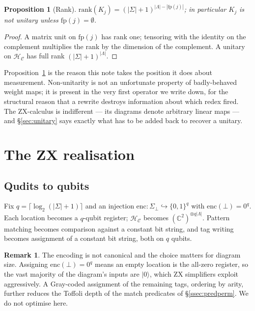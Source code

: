 \documentclass[11pt]{article}
\theoremstyle{definition}
\newtheorem{remark}[definition]{Remark}
\theoremstyle{plain}
\newtheorem{proposition}[definition]{Proposition}
\newcommand{\Loc}{\Lambda}
\newcommand{\Tags}{\Sigma}
\newcommand{\Tagsb}{\Tags_{\bot}}
\newcommand{\Cfg}{\mathcal{C}}
\newcommand{\Hs}{\mathcal{H}}
\newcommand{\Hc}{\Hs_{\Cfg}}
\newcommand{\fp}{\mathrm{fp}}
\newcommand{\ket}[1]{| #1 \rangle}
\begin{document}
\begin{proposition}[Rank]\label{prop:rank}
$\mathrm{rank}(K_j) = (|\Tags|+1)^{|\Loc| - |\fp(j)|}$; in particular $K_j$ is not unitary
unless $\fp(j) = \emptyset$.
\end{proposition}

\begin{proof}
A matrix unit on $\fp(j)$ has rank one; tensoring with the identity on the complement multiplies
the rank by the dimension of the complement. A unitary on $\Hc$ has full rank
$(|\Tags|+1)^{|\Loc|}$.
\end{proof}

Proposition~\ref{prop:rank} is the reason this note takes the position it does about
measurement. Non-unitarity is not an unfortunate property of badly-behaved weight maps; it is
present in the very first operator we write down, for the structural reason that a rewrite
destroys information about which redex fired. The ZX-calculus is indifferent --- its diagrams
denote arbitrary linear maps --- and \S\ref{sec:unitary} says exactly what has to be added back
to recover a unitary.

\section{The ZX realisation}\label{sec:zx}

\subsection{Qudits to qubits}\label{ssec:qubits}

Fix $q = \lceil \log_2 (|\Tags|+1)\rceil$ and an injection
$\mathrm{enc} : \Tagsb \hookrightarrow \{0,1\}^q$ with $\mathrm{enc}(\bot) = 0^q$. Each location
becomes a $q$-qubit register; $\Hc$ becomes $(\mathbb{C}^2)^{\otimes q|\Loc|}$. Pattern matching
becomes comparison against a constant bit string, and tag writing becomes assignment of a
constant bit string, both on $q$ qubits.

\begin{remark}
The encoding is not canonical and the choice matters for diagram size. Assigning
$\mathrm{enc}(\bot) = 0^q$ means an empty location is the all-zero register, so the vast
majority of the diagram's inputs are $\ket{0}$, which ZX simplifiers exploit aggressively. A
Gray-coded assignment of the remaining tags, ordering by arity, further reduces the Toffoli
depth of the match predicates of \S\ref{ssec:predperm}. We do not optimise here.
\end{remark}
\end{document}
